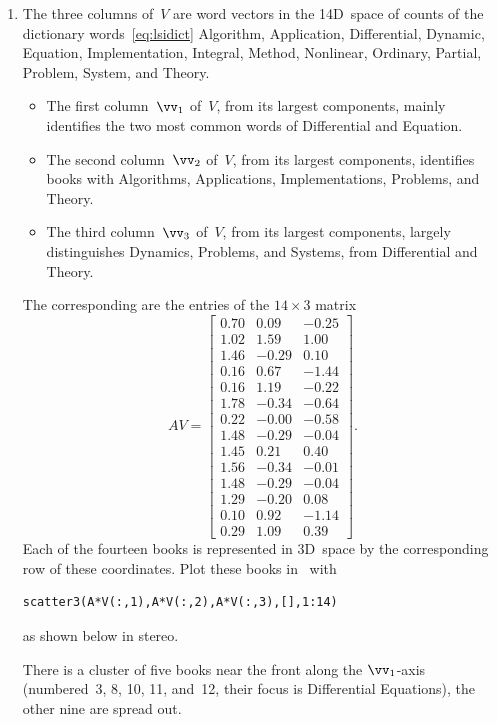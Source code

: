 \begin{enumerate}
\item The three  columns of~\(V\) are word vectors in the 14D~space of counts of the dictionary words~\eqref{eq:lsidict} Algorithm,
Application,
Differential,
Dynamic,
Equation,
Implementation,
Integral,
Method,
Nonlinear,
Ordinary,
Partial,
Problem,
System, and
Theory.
\begin{itemize}
\item The first column~\(\vv_1\) of~\(V\), from its largest components, mainly identifies the two most common words of Differential and Equation.
\item The second column~\(\vv_2\) of~\(V\), from its largest components, identifies books with Algorithms, Applications, Implementations, Problems, and Theory.
\item The third column~\(\vv_3\) of~\(V\), from its largest components, largely distinguishes Dynamics, Problems, and Systems, from Differential and Theory.
\end{itemize}
The corresponding  are the entries of the \(14\times3\) matrix \twodp
\begin{equation*}
AV=\begin{bmatrix} 0.70 & 0.09 & -0.25
\\1.02 & 1.59 & 1.00
\\1.46 & -0.29 & 0.10
\\0.16 & 0.67 & -1.44
\\0.16 & 1.19 & -0.22
\\1.78 & -0.34 & -0.64
\\0.22 & -0.00 & -0.58
\\1.48 & -0.29 & -0.04
\\1.45 & 0.21 & 0.40
\\1.56 & -0.34 & -0.01
\\1.48 & -0.29 & -0.04
\\1.29 & -0.20 & 0.08
\\0.10 & 0.92 & -1.14
\\0.29 & 1.09 & 0.39 \end{bmatrix}.
\end{equation*}
Each of the fourteen books is represented in 3D~space by the corresponding row of these coordinates.
Plot these books in \script\ with 
\begin{verbatim}
scatter3(A*V(:,1),A*V(:,2),A*V(:,3),[],1:14)
\end{verbatim}
as shown below in stereo.
\begin{center}
\end{center}
There is a cluster of five books near the front along the \(\vv_1\)-axis (numbered~3, 8, 10, 11, and~12, their focus is Differential Equations), the other nine are spread out.
\end{enumerate}

